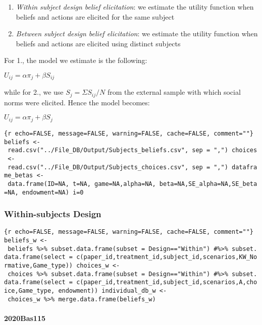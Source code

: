 \begin{enumerate}
\def\labelenumi{\arabic{enumi}.}
\tightlist
\item
  \emph{Within subject design belief elicitation}: we estimate the
  utility function when beliefs and actions are elicited for the same
  subject
\item
  \emph{Between subject design belief elicitation}: we estimate the
  utility function when beliefs and actions are elicited using distinct
  subjects
\end{enumerate}

For 1., the model we estimate is the following:

\(U_{ij} = \alpha \pi_j + \beta S_{ij}\)

while for 2., we use \(S_j=\Sigma S_{ij}/N\) from the external sample
with which social norms were elicited. Hence the model becomes:

\(U_{ij} = \alpha \pi_j + \beta S_{j}\)

\texttt{\{r\ echo=FALSE,\ message=FALSE,\ warning=FALSE,\ cache=FALSE,\ comment=""\}\ beliefs\ \textless{}-\ read.csv("../File\_DB/Output/Subjects\_beliefs.csv",\ sep\ =\ ",")\ choices\ \textless{}-\ read.csv("../File\_DB/Output/Subjects\_choices.csv",\ sep\ =\ ",")\ dataframe\_betas\ \textless{}-\ data.frame(ID=NA,\ t=NA,\ game=NA,alpha=NA,\ beta=NA,SE\_alpha=NA,SE\_beta=NA,\ endowment=NA)\ i=0}

\hypertarget{within-subjects-design}{%
\subsubsection{Within-subjects Design}\label{within-subjects-design}}

\texttt{\{r\ echo=FALSE,\ message=FALSE,\ warning=FALSE,\ cache=FALSE,\ comment=""\}\ beliefs\_w\ \textless{}-\ beliefs\ \%\textgreater{}\%\ subset.data.frame(subset\ =\ Design=="Within")\ \#\%\textgreater{}\%\ subset.data.frame(select\ =\ c(paper\_id,treatment\_id,subject\_id,scenarios,KW\_Normative,Game\_type))\ choices\_w\ \textless{}-\ choices\ \%\textgreater{}\%\ subset.data.frame(subset\ =\ Design=="Within")\ \#\%\textgreater{}\%\ subset.data.frame(select\ =\ c(paper\_id,treatment\_id,subject\_id,scenarios,A,choice,Game\_type,\ endowment))\ individual\_db\_w\ \textless{}-\ choices\_w\ \%\textgreater{}\%\ merge.data.frame(beliefs\_w)}

\hypertarget{bas115}{%
\paragraph{2020Bas115}\label{bas115}}

